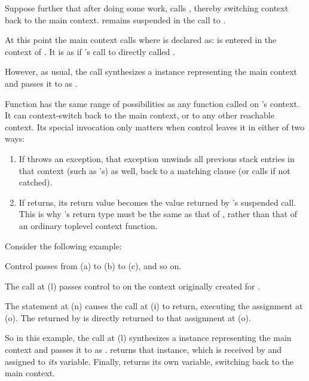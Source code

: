 Suppose further that after doing some work,  calls ,
thereby switching context back to the main context.  remains
suspended in the call to .

At this point the main context calls 
where  is declared as:
\newline
\ectxvoid{}\ectxvoid{}
\newline
{} is entered in the context of . It is as if 's call
to  directly called .

However, as usual, the  call synthesizes a \ectx
instance representing the main context and passes it to 
as .

Function  has the same range of possibilities as any function called
on 's context. It can context-switch back to the main context, or to
any other reachable context. Its special invocation only matters when control
leaves it in either of two ways:

\begin{enumerate}
  \item If  throws an exception, that exception unwinds all previous
  stack entries in that context (such as 's) as well, back to a
  matching  clause (or calls  if not catched).
  \item If  returns, its return value becomes the value returned
  by 's suspended  call. This is
  why 's return type must be the same as that of \op, rather than
  that of an ordinary toplevel context function.
\end{enumerate}

Consider the following example:


Control passes from (a) to (b) to (c), and so on.

The  call at (l) passes control
to  on the context originally created for .

The  statement at (n) causes the \op call at (i) to return,
executing the assignment at (o). The  returned by 
is directly returned to that assignment at (o).

So in this example, the call at (l) synthesizes a \ectx instance representing
the main context and passes it to  as .  returns
that  instance, which is received by  and assigned
to \emph{its}  variable. Finally,  returns its
own  variable, switching back to the main context.


